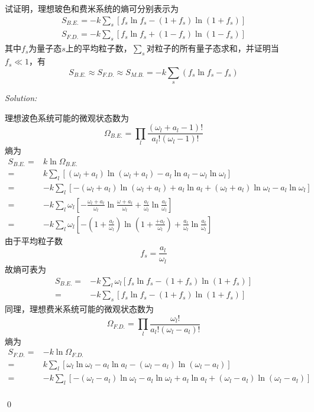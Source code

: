 \documentclass[12pt,a4paper]{article}
\newenvironment{problem}[2][Problem]{\begin{trivlist}
\item[\hskip \labelsep {\bfseries #1}\hskip \labelsep {\bfseries #2.}]}{\end{trivlist}}
\newenvironment{sol}
    {\emph{Solution:}
    }
    {
    \qed
    }
\begin{document}
\begin{problem}{8.2}
试证明，理想玻色和费米系统的熵可分别表示为
\begin{gather*}
S_{B.E.}=-k\sum_s[f_s\ln f_s-(1+f_s)\ln(1+f_s)]\\
S_{F.D.}=-k\sum_s[f_s\ln f_s+(1-f_s)\ln(1-f_s)]
\end{gather*}
其中$f_s$为量子态$s$上的平均粒子数，$\sum_s$对粒子的所有量子态求和，并证明当$f_s\ll1$，有
\[
S_{B.E.}\approx S_{F.D.}\approx S_{M.B.}=-k\sum_s(f_s\ln f_s-f_s)
\]
\end{problem}
\begin{sol}
理想波色系统可能的微观状态数为
\begin{equation}
\Omega_{B.E.}=\prod_l\frac{(\omega_l+a_l-1)!}{a_l!(\omega_l-1)!}
\end{equation}
熵为
\begin{align}
\nonumber S_{B.E.}=&k\ln\Omega_{B.E.}\\
\nonumber=&k\sum_l[(\omega_l+a_l)\ln(\omega_l+a_l)-a_l\ln a_l-\omega_l\ln\omega_l]\\
\nonumber=&-k\sum_l[-(\omega_l+a_l)\ln(\omega_l+a_l)+a_l\ln a_l+(\omega_l+a_l)\ln\omega_l-a_l\ln\omega_l]\\
\nonumber=&-k\sum_l\omega_l[-\frac{\omega_l+a_l}{\omega_l}\ln\frac{\omega+a_l}{\omega_l}+\frac{a_l}{\omega_l}\ln\frac{a_l}{\omega_l}]\\
=&-k\sum_l\omega_l[-(1+\frac{a_l}{\omega_l})\ln(1+\frac{+a_l}{\omega_l})+\frac{a_l}{\omega_l}\ln\frac{a_l}{\omega_l}]
\end{align}
由于平均粒子数
\begin{equation}
f_s=\frac{a_l}{\omega_l}
\end{equation}
故熵可表为
\begin{align}
\nonumber S_{B.E.}=&-k\sum_l\omega_l[f_s\ln f_s-(1+f_s)\ln(1+f_s)]\\
=&-k\sum_s[f_s\ln f_s-(1+f_s)\ln(1+f_s)]
\end{align}
同理，理想费米系统可能的微观状态数为
\begin{equation}
\Omega_{F.D.}=\prod_l\frac{\omega_l!}{a_l!(\omega_l-a_l)!}
\end{equation}
熵为
\begin{align}
\nonumber S_{F.D.}=&-k\ln\Omega_{F.D.}\\
\nonumber=&k\sum_l[\omega_l\ln\omega_l-a_l\ln a_l-(\omega_l-a_l)\ln(\omega_l-a_l)]\\
\nonumber=&-k\sum_l[-(\omega_l-a_l)\ln\omega_l-a_l\ln\omega_l+a_l\ln a_l+(\omega_l-a_l)\ln(\omega_l-a_l)]\\

\end{align}
\end{sol}
\end{document}
